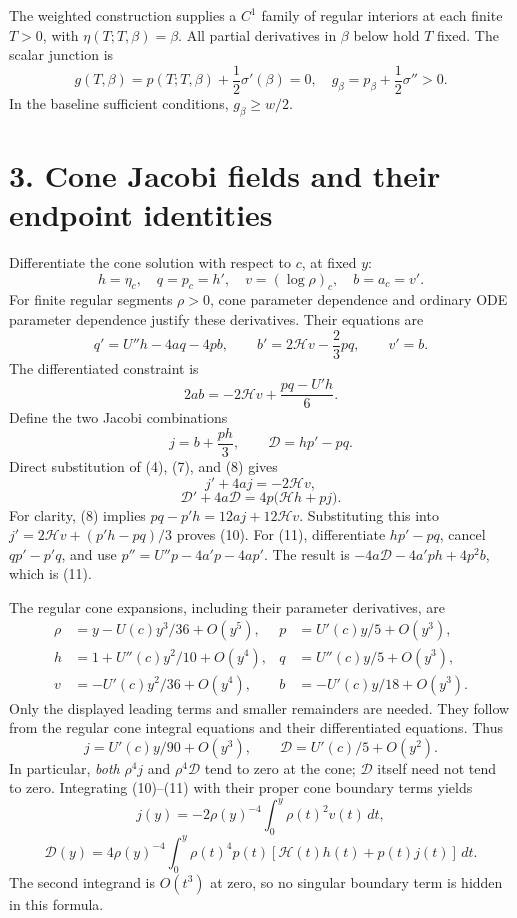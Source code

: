 \documentclass[11pt]{article}
\begin{document}
The weighted construction supplies a \(C^1\) family of regular interiors at
each finite \(T>0\), with \(\eta(T;T,\beta)=\beta\). All partial derivatives in
\(\beta\) below hold \(T\) fixed. The scalar junction is
\[
 g(T,\beta)=p(T;T,\beta)+\frac12\sigma'(\beta)=0,
 \quad
 g_\beta=p_\beta+\frac12\sigma''>0.                 \tag{6}
\]
In the baseline sufficient conditions, \(g_\beta\geq w/2\).

\section{3. Cone Jacobi fields and their endpoint identities}\label{cone-jacobi-fields-and-their-endpoint-identities}

Differentiate the cone solution with respect to \(c\), at fixed \(y\):
\[
 h=\eta_c,\quad q=p_c=h',\quad
 v=(\log\rho)_c,\quad b=a_c=v'.
\]
For finite regular segments \(\rho>0\), cone parameter dependence and ordinary
ODE parameter dependence justify these derivatives. Their equations are
\[
 q'=U''h-4aq-4pb,\qquad
 b'=2\mathcal H v-\frac23pq,\qquad v'=b.            \tag{7}
\]
The differentiated constraint is
\[
 2ab=-2\mathcal H v+\frac{pq-U'h}{6}.               \tag{8}
\]
Define the two Jacobi combinations
\[
 j=b+\frac{ph}{3},\qquad
 \mathcal D=h p'-p q.                              \tag{9}
\]
Direct substitution of (4), (7), and (8) gives
\[
 j'+4aj=-2\mathcal H v,                            \tag{10}
\]
\[
 \mathcal D'+4a\mathcal D
       =4p\bigl(\mathcal H h+p j\bigr).             \tag{11}
\]
For clarity, (8) implies
\(pq-p'h=12aj+12\mathcal H v\). Substituting this into
\(j'=2\mathcal H v+(p'h-pq)/3\) proves (10).
For (11), differentiate \(hp'-pq\), cancel \(qp'-p'q\), and use
\(p''=U''p-4a'p-4ap'\). The result is
\(-4a\mathcal D-4a'ph+4p^2b\), which is (11).

The regular cone expansions, including their parameter derivatives, are
\[
 \begin{aligned}
 \rho&=y-U(c)y^3/36+O(y^5),&
 p&=U'(c)y/5+O(y^3),\\
 h&=1+U''(c)y^2/10+O(y^4),&
 q&=U''(c)y/5+O(y^3),\\
 v&=-U'(c)y^2/36+O(y^4),&
 b&=-U'(c)y/18+O(y^3).
 \end{aligned}                                    \tag{12}
\]
Only the displayed leading terms and smaller remainders are needed. They follow
from the regular cone integral equations and their differentiated equations.
Thus
\[
 j=U'(c)y/90+O(y^3),\qquad
 \mathcal D=U'(c)/5+O(y^2).                         \tag{13}
\]
In particular, \emph{both} \(\rho^4j\) and \(\rho^4\mathcal D\) tend to zero at
the cone; \(\mathcal D\) itself need not tend to zero. Integrating (10)--(11)
with their proper cone boundary terms yields
\[
 j(y)=-2\rho(y)^{-4}\int_0^y\rho(t)^2v(t)\,dt,      \tag{14}
\]
\[
 \mathcal D(y)=4\rho(y)^{-4}
   \int_0^y\rho(t)^4p(t)
        [\mathcal H(t)h(t)+p(t)j(t)]\,dt.           \tag{15}
\]
The second integrand is \(O(t^3)\) at zero, so no singular boundary term is
hidden in this formula.
\end{document}

